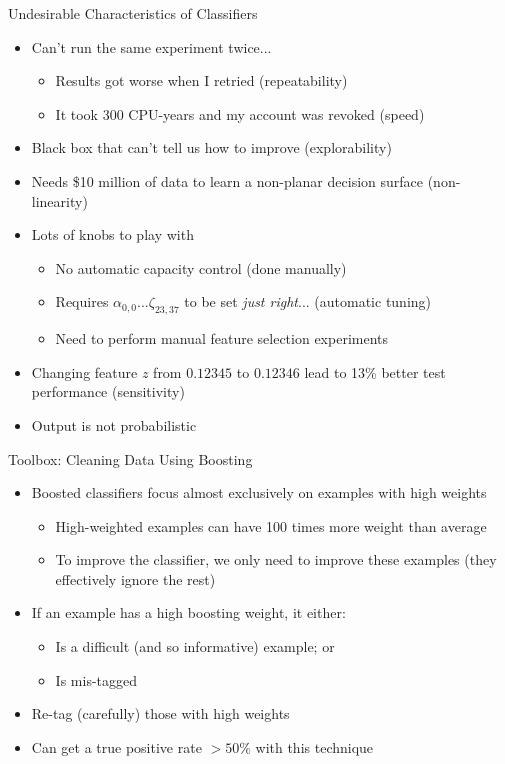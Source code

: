\documentclass{beamer}
\begin{document}
\begin{frame}{Undesirable Characteristics of Classifiers}
\begin{itemize}
\item Can't run the same experiment twice...
  \begin{itemize}
    \item Results got worse when I retried (\alert{repeatability})
    \item It took 300 CPU-years and my account was revoked (\alert{speed})
  \end{itemize}
\item Black box that can't tell us how to improve (\alert{explorability})
\item Needs \$10 million of data to learn a non-planar decision surface (\alert{non-linearity})
\item Lots of knobs to play with
  \begin{itemize}
  \item No \alert{automatic capacity control} (done manually)
  \item Requires $\alpha_{0,0} ... \zeta_{23,37}$ to be set \emph{just right}... (\alert{automatic tuning})
  \item Need to perform manual \alert{feature selection} experiments
  \end{itemize}
\item Changing feature $z$ from $0.12345$ to $0.12346$ lead to 13\% better test performance (\alert{sensitivity})
\item Output is not \alert{probabilistic}
\end{itemize}
\end{frame}

\begin{frame}{Toolbox: Cleaning Data Using Boosting}
  
  \begin{itemize}
  \item Boosted classifiers focus \alert{almost exclusively} on examples with \alert{high weights}
    \begin{itemize}
    \item High-weighted examples can have 100 times more weight than average
    \item To improve the classifier, we only need to improve these examples (they effectively ignore the rest)
    \end{itemize}
  \item If an example has a high boosting weight, it either:
    \begin{itemize}
    \item Is a difficult (and so informative) example; or
    \item Is mis-tagged
    \end{itemize}
  \item Re-tag (carefully) those with high weights
  \item Can get a true positive rate $> 50\%$ with this technique
  \end{itemize}
  
\end{frame}
\end{document}
